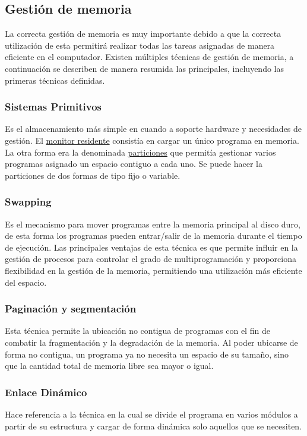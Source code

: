 \documentclass{article}
\begin{document}
\subsection{Gestión de memoria}
La correcta gestión de memoria es muy importante debido a que la correcta utilización de esta permitirá realizar todas las tareas asignadas de manera eficiente en el computador. Existen múltiples técnicas de gestión de memoria, a continuación se describen de manera resumida las principales, incluyendo las primeras técnicas definidas.\cite{Gestion}

\subsubsection{Sistemas Primitivos}
Es el almacenamiento más simple en cuando a soporte hardware y necesidades de gestión. El \underline{monitor residente} consistía en cargar un único programa en memoria. La otra forma era la denominada \underline{particiones} que permitía gestionar varios programas asignado un espacio contiguo a cada uno. Se puede hacer la particiones de dos formas de tipo fijo o variable.

\subsubsection{Swapping}
Es el mecanismo para mover programas entre la memoria principal al disco duro, de esta forma los programas pueden entrar/salir de la memoria durante el tiempo de ejecución. Las principales ventajas de esta técnica es que permite influir en la gestión de procesos para controlar el grado de multiprogramación y proporciona flexibilidad en la gestión de la memoria, permitiendo una utilización más eficiente del espacio.

\subsubsection{Paginación y segmentación}
Esta técnica permite la ubicación no contigua de programas con el fin de combatir la fragmentación y la degradación de la memoria. Al poder ubicarse de forma no contigua, un programa ya no necesita un espacio de su tamaño, sino que la cantidad total de memoria libre sea mayor o igual.

\subsubsection{Enlace Dinámico}
Hace referencia a la técnica en la cual se divide el programa en varios módulos a partir de su estructura y cargar de forma dinámica solo aquellos que se necesiten.
\end{document}
